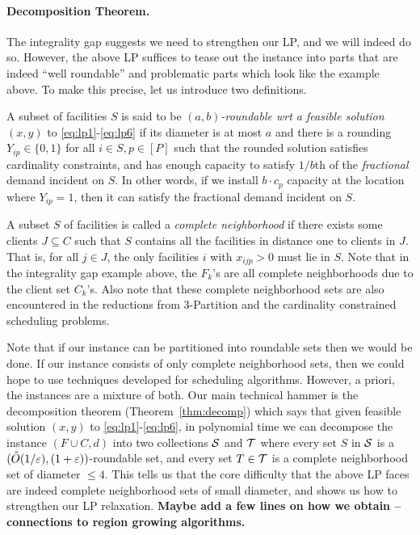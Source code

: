 \paragraph{Decomposition Theorem.}
The integrality gap suggests we need to strengthen our LP, and we will indeed do so. However, the above LP suffices to tease out the instance into parts that are indeed ``well roundable'' and problematic parts which look like the example above.
To make this precise, let us introduce two definitions.  
\begin{asparaitem}
\item A subset of facilities $S$ is said to be {\em $(a,b)$-roundable wrt a feasible solution $(x,y)$} to \eqref{eq:lp1}-\eqref{eq:lp6} if its diameter is at most $a$ and there is a rounding $Y_{ip}\in \{0,1\}$ for all $i\in S,p\in [P]$
such that the rounded solution satisfies cardinality constraints, and  has enough capacity to satisfy $1/b$th of  the {\em fractional} demand incident on $S$. In other words, if we install $b\cdot c_p$ capacity at the location where $Y_{ip} = 1$, then it can satisfy the fractional demand incident on $S$.
\item 
A subset $S$ of facilities is called a {\em complete neighborhood} if there exists some clients $J\subseteq C$ such that $S$ contains all the facilities in distance one to clients in $J$.  That is, for all $j\in J$, the only facilities $i$ with $x_{ijp} > 0$ must lie in $S$.
Note that in the integrality gap example above, the $F_k$'s are all complete neighborhoods due to the client set $C_k$'s. Also note that these complete neighborhood sets are also encountered in the reductions from $3$-Partition and the cardinality constrained scheduling problems.
\end{asparaitem}
Note that if our instance can be partitioned into roundable sets then we would be done. If our instance consists of only complete neighborhood sets, then we could hope to use techniques developed for scheduling algorithms. However, a priori, the instances are a mixture of both.
Our main technical hammer is the decomposition theorem (Theorem~\ref{thm:decomp}) which says that given feasible solution $(x,y)$ to \eqref{eq:lp1}-\eqref{eq:lp6}, in polynomial time we can decompose the instance $(F\cup C,d)$ into two collections ${\cal S}$ and ${\cal T}$ where
every set $S$ in ${\cal S}$ is a $(\tilde{O}(1/\varepsilon),(1+\varepsilon))$-roundable set, and every set $T\in {\cal T}$ is a complete neighborhood set of diameter $\leq 4$. This tells us that the core difficulty that the above LP faces are indeed complete neighborhood sets of small diameter, and shows us how to strengthen our LP relaxation. {\bf Maybe add a few lines on how we obtain -- connections to region growing algorithms.} \medskip

